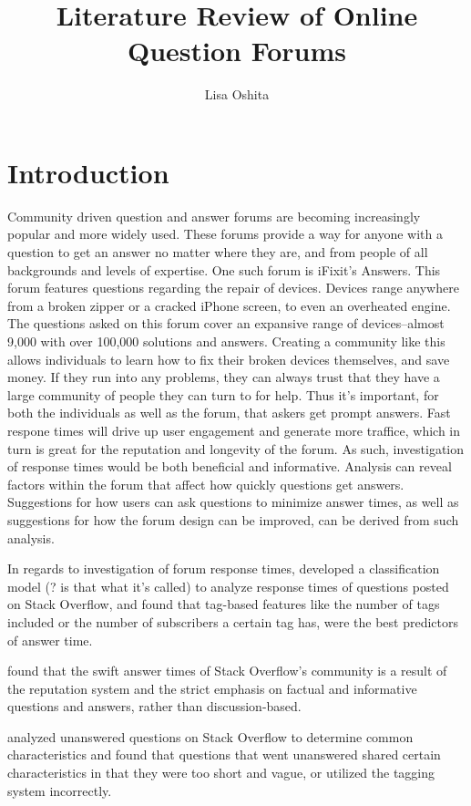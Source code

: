 \documentclass[12pt]{article}
\title{Literature Review of Online Question Forums}
\author{Lisa Oshita}
\date{}
\begin{document}
\maketitle

\section{Introduction}

    Community driven question and answer forums are becoming increasingly popular and more widely used. These forums provide a way for anyone with a question to get an answer no matter where they are, and from people of all backgrounds and levels of expertise. One such forum is iFixit's Answers. This forum features questions regarding the repair of devices. Devices range anywhere from a broken zipper or a cracked iPhone screen, to even an overheated engine. The questions asked on this forum cover an expansive range of devices--almost 9,000 with over 100,000 solutions and answers. Creating a community like this allows individuals to learn how to fix their broken devices themselves, and save money. If they run into any problems, they can always trust that they have a large community of people they can turn to for help. Thus it's important, for both the individuals as well as the forum, that askers get prompt answers. Fast respone times will drive up user engagement and generate more traffice, which in turn is great for the reputation and longevity of the forum. As such, investigation of response times would be both beneficial and informative. Analysis can reveal factors within the forum that affect how quickly questions get answers. Suggestions for how users can ask questions to minimize answer times, as well as suggestions for how the forum design can be improved, can be derived from such analysis. 

    In regards to investigation of forum response times, \citep{Bhat2014} developed a classification model (? is that what it's called) to analyze response times of questions posted on Stack Overflow, and found that tag-based features like the number of tags included or the number of subscribers a certain tag has, were the best predictors of answer time. 

    \citep{Mamykina2011} found that the swift answer times of Stack Overflow's community is a result of the reputation system and the strict emphasis on factual and informative questions and answers, rather than discussion-based. 

    \citep{Asaduzzaman2013} analyzed unanswered questions on Stack Overflow to determine common characteristics and found that questions that went unanswered shared certain characteristics in that they were too short and vague, or utilized the tagging system incorrectly. 
\end{document}
